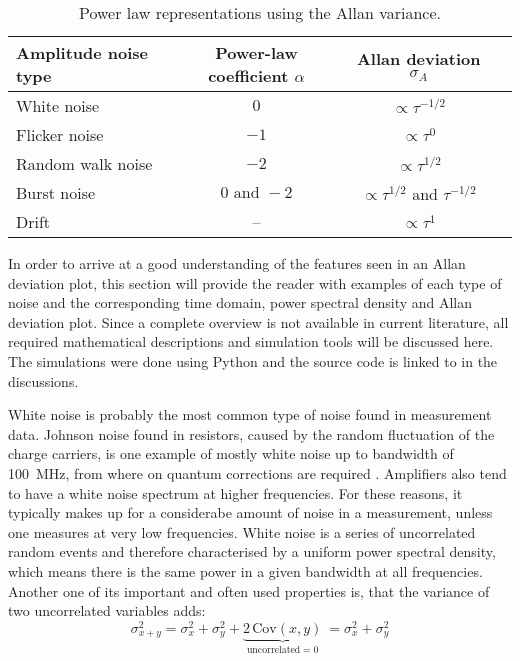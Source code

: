 \begin{table}[ht]
    \centering
    \begin{tabular}{lccc}
        \toprule
        Amplitude noise type& Power-law coefficient $\alpha$& Allan deviation $\sigma_A$\\
        \midrule
            White noise & $0$& $\propto \tau^{-1/2}$ \cite{adev_noise_types}\\
            Flicker noise& $-1$& $\propto \tau^0$ \cite{adev_noise_types}\\
            Random walk noise& $-2$& $\propto \tau^{1/2}$ \cite{adev_noise_types}\\
            Burst noise& $0 \textrm{ and } -\!2$& $\propto \tau^{1/2} \textrm{ and } \tau^{-1/2}$\\
            Drift & --& $\propto \tau^1$ \cite{adev_drift}\\
        \bottomrule
    \end{tabular}
    \caption{Power law representations using the Allan variance.}
    \label{tab:adev_alpha}
\end{table}

In order to arrive at a good understanding of the features seen in an Allan deviation plot, this section will provide the reader with examples of each type of noise and the corresponding time domain, power spectral density and Allan deviation plot. Since a complete overview is not available in current literature, all required mathematical descriptions and simulation tools will be discussed here. The simulations were done using Python and the source code is linked to in the discussions.

White noise is probably the most common type of noise found in measurement data. Johnson noise found in resistors, caused by the random fluctuation of the charge carriers, is one example of mostly white noise up to bandwidth of \qty{100}{\MHz}, from where on quantum corrections are required \cite{nist_johnson_noise}. Amplifiers also tend to have a white noise spectrum at higher frequencies. For these reasons, it typically makes up for a considerabe amount of noise in a measurement, unless one measures at very low frequencies. White noise is a series of uncorrelated random events and therefore characterised by a uniform power spectral density, which means there is the same power in a given bandwidth at all frequencies. Another one of its important and often used properties is, that the variance of two uncorrelated variables adds:
\begin{equation}
    \sigma_{x+y}^2  = \sigma_x^2 + \sigma_y^2 + \underbrace{2\,\mathrm{Cov}(x,y)}_{\text{uncorrelated} = 0}\ = \sigma_x^2 + \sigma_y^2
\end{equation}

